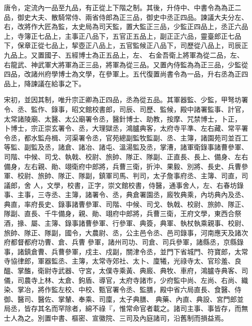\begin{pinyinscope}
 唐令，定流內一品至九品，有正從上下階之制。其後，升侍中、中書令為為正二品，御史大夫、散騎常侍、兩省侍郎為正三品，御史中丞正四品。諫議大夫分左、右，改將作大匠為監，太史局為司天監，置大監正三品，少監正四品上，丞正六品上，寺簿正七品上，主事正八品下，五官正五品上，副正正六品，靈臺郎正七品下，保章正從七品上，挈壺正八品上，五官監候正八品下，司歷從八品上，司辰正九品上。又置國子、五經博士為正五品上，左、
 右金吾衛上將軍為從二品，左、右龍武、神武軍大將軍為正三品，將軍為從三品。又置內侍監為為正三品，少監從四品，改諸州府學博士為文學，在參軍上。五代復置尚書令為一品，升右丞為正四品上，降諫議在給事之下。



 宋初，並因其制，唯升宗正卿為正四品，丞為從五品。其軍器監、少監，甲弩坊署令、丞、監作、錄事，昭文館校書郎，司辰、司歷、監候，殿中諸署監事、計官，太常諸陵廟、太醫、太公廟署令丞，醫針博士、助教，按摩、咒禁博士，卜正，
 卜博士，宗正崇玄署令、丞，大理獄丞，鴻臚典客，太府寺平準、左右藏、常平署令丞，都水監舟楫、河渠署令丞，官苑總副監牧監副、丞、主簿，諸園苑司並百工等監、副監及丞，諸倉、諸冶、諸屯、溫湯監及丞，掌漕，諸軍衛錄事諸曹參軍、司階、中候、司戈、執戟、校尉、旅帥、隊正、隊副、正直長、長上、備身、左右備身，左右親、勛、翊衛府中郎將，兵曹三衛，折沖、果毅、別將、長史、兵曹參軍、校尉、旅帥、隊正、隊副，鎮軍司馬、判司，太子詹事府丞、主簿、司直，司議郎，舍
 人，文學，校書，正字，崇文館校書，侍醫，通事舍人，左、右春坊錄事、主事，三寺丞、主簿，諸署令、丞，典倉署園丞，廄牧典乘，內坊典內及丞、典直，率府長史、錄事諸曹參軍、司階、中候、司戈、執戟、校尉、旅帥、隊正、隊副、直長、千牛備身，親、勛、翊府中郎將，兵曹三衛，王府文學，東西合祭酒，掾、屬、主簿、錄事諸曹參軍、行參軍、典簽，典軍、執杖執乘親事、校尉、旅帥、隊正、隊副，國令，大農尉、丞，公主邑令丞、邑司錄事，河南應天及諸次府都督都府功曹、倉、兵曹
 參軍，諸州司功、司倉、司兵參軍，諸縣丞，京縣錄事，諸鎮倉曹、兵曹參軍，戍主、戍副，關津令丞，並門下省城門、符寶郎，太常寺協律郎，軍器監丞、主簿，太常寺郊社、太卜、廩犧，光祿寺太、官珍羞、良醞、掌醢，衛尉寺武器、守宮，太僕寺乘黃、典廄、典牧、車府，鴻臚寺典客、司儀，司農寺上林、太倉、鉤盾、導官，太府寺諸市，少府監中尚、左尚、右尚、織染、掌冶，將作監左校、中校、甄官署令丞、監膳，殿中省六局直長、食醫、侍御、醫司、醫佐、掌輦、奉乘、司廩，太子典膳、
 典藥、內直、典設、宮門郎並局丞，皆存其名而罕除者，綿不祿『，惟常命官者載之。諸司主事、事皆存，而無士人為之。別置中書、樞密、宣徽院、三司及內庭諸司，沿舊制而損益焉。




\end{pinyinscope}
